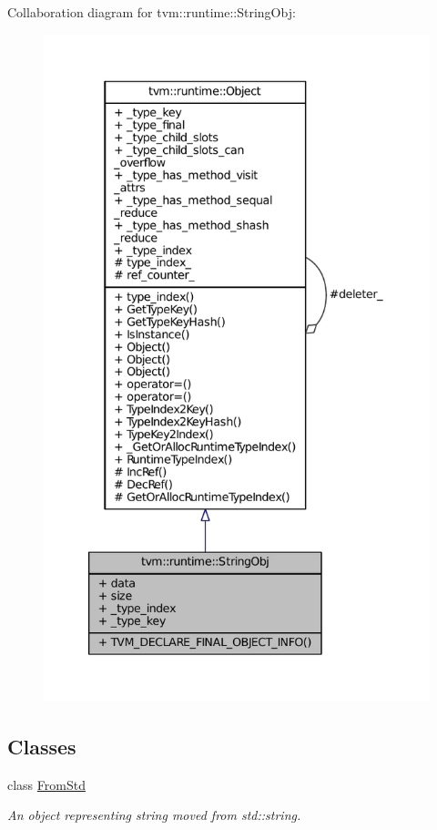 Collaboration diagram for tvm\+:\+:runtime\+:\+:String\+Obj\+:
\nopagebreak
\begin{figure}[H]
\begin{center}
\leavevmode
\includegraphics[height=550pt]{classtvm_1_1runtime_1_1StringObj__coll__graph}
\end{center}
\end{figure}
\subsection*{Classes}
\begin{DoxyCompactItemize}
\item 
class \hyperlink{classtvm_1_1runtime_1_1StringObj_1_1FromStd}{From\+Std}
\begin{DoxyCompactList}\small\item\em An object representing string moved from std\+::string. \end{DoxyCompactList}\end{DoxyCompactItemize}
